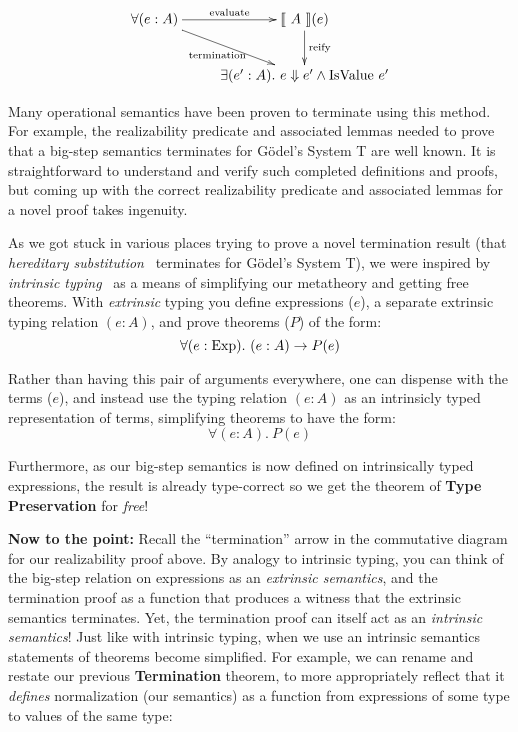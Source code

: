 \documentclass[preprint,nonatbib]{sigplanconf}
\numberwithin{subdefin}{defin}
\theoremstyle{definition}
\numberwithin{subtheorem}{theorem}
\numberwithin{sublemma}{theorem}
\numberwithin{corollary}{theorem}
\numberwithin{case}{theorem}
\numberwithin{slcase}{sublemma}
\numberwithin{scase}{subtheorem}
\numberwithin{lcase}{lemma}
\def\bigstep{\Downarrow}
\def\marr{\rightarrow}
\newcommand{\ascribe}[2]{(#1 : #2)}
\newcommand{\all}[1]{\forall#1.~}
\newcommand{\el}[1]{\llbracket ~ #1 ~ \rrbracket}
\newcommand{\con}[1]{\textmd{#1}}
\newcommand{\fun}[1]{\textmd{#1}}
\begin{document}
\begin{displaymath}
    \xymatrix{
          {\forall (e : A)} 
          \ar[dr]_{\fun{termination}}
          \ar[r]^{\fun{evaluate}}
        & {\el{A}(e)}
          \ar[d]^{\large{\fun{reify}}}
\\      & {\exists (e' : A). ~ e \bigstep e' \wedge \fun{IsValue} ~ e'} }
\end{displaymath}

Many operational semantics have been proven to terminate using this
method. For example, the realizability predicate and associated lemmas
needed to prove that a big-step semantics terminates for G{\"o}del's
System T are well known. It is straightforward to understand and verify such
completed definitions and proofs, but coming up with the correct
realizability predicate and associated lemmas for a novel proof takes
ingenuity. 

As we got stuck in various places trying to prove a novel termination result
(that {\it hereditary substitution}~\cite{TODO} terminates for
G{\"o}del's System T), we were inspired by
{\it intrinsic typing}~\cite{TODO} as a means of simplifying our
metatheory and getting free theorems. With {\it extrinsic} typing you
define expressions ($e$), a separate extrinsic typing relation $\ascribe{e}{A}$, and prove
theorems ($P$) of the form:
$$
\all{\ascribe{e}{\con{Exp}}} \ascribe{e}{A} \marr P(e) $$

Rather than having this pair of arguments everywhere, one can dispense with
the terms ($e$), and instead use the typing relation $\ascribe{e}{A}$
as an intrinsicly typed representation of terms, simplifying theorems to
have the form:
$$
\all{\ascribe{e}{A}} P(e)
$$

Furthermore, as our big-step semantics is now defined on intrinsically
typed expressions, the result is already type-correct so we get the
theorem of {\bf Type Preservation} for {\it free}!

{\bf Now to the point:} 
Recall the ``termination'' arrow in the commutative diagram for our
realizability proof above. By analogy to intrinsic typing, you
can think of the big-step relation on expressions as an
{\it extrinsic semantics}, and the termination proof as a function
that produces a witness that the extrinsic semantics terminates. Yet,
the termination proof can itself act as an {\it intrinsic semantics}! 
Just like with intrinsic typing, when we use an intrinsic semantics
statements of theorems become simplified. For example, we can rename
and restate our previous {\bf Termination} theorem, to more
appropriately reflect that it {\it defines} normalization (our
semantics) as a function from expressions of some type to values of
the same type:
\end{document}
